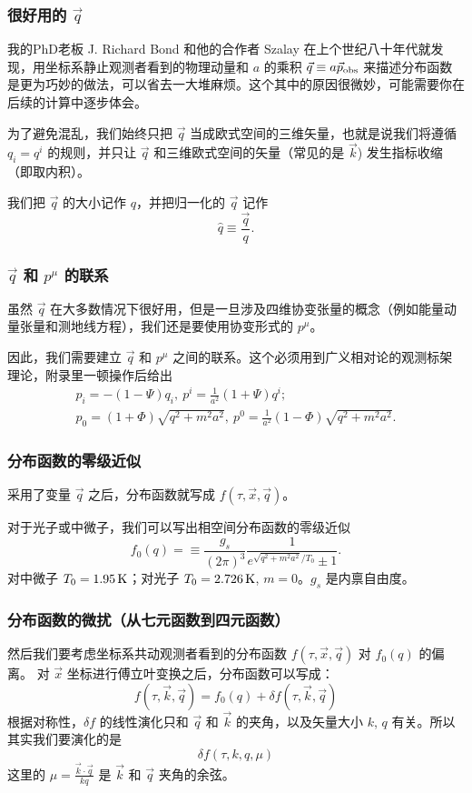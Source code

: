 \documentclass[CJK,13pt]{beamer}
\begin{document}
  \begin{frame}
    \frametitle{很好用的 $\vec{q}$ }
    我的PhD老板 J. Richard Bond 和他的合作者 Szalay 在上个世纪八十年代就发现，用坐标系静止观测者看到的物理动量和 $a$ 的乘积 $\vec{q}\equiv a \vec{p}_{\rm obs}$ 来描述分布函数是更为巧妙的做法，可以省去一大堆麻烦。这个其中的原因很微妙，可能需要你在后续的计算中逐步体会。

    \skipline

    为了避免混乱，我们始终只把 $\vec{q}$ 当成欧式空间的三维矢量，也就是说我们将遵循 {\blue $q_i = q^i$} 的规则，并只让 $\vec{q}$ 和三维欧式空间的矢量（常见的是 $\vec{k}$) 发生指标收缩（即取内积）。

    \skipline      

    我们把 $\vec{q}$ 的大小记作 $q$，并把归一化的 $\vec{q}$ 记作
    $$\hat{q} \equiv \frac{\vec{q}}{q}.$$
  \end{frame}

  \begin{frame}
    \frametitle{$\vec{q}$ 和 $p^\mu$ 的联系}
    虽然 $\vec{q}$ 在大多数情况下很好用，但是一旦涉及四维协变张量的概念（例如能量动量张量和测地线方程），我们还是要使用协变形式的 $p^\mu$。

    因此，我们需要建立 $\vec{q}$ 和 $p^\mu$ 之间的联系。这个必须用到广义相对论的观测标架理论，附录里一顿操作后给出{\blue
    \begin{eqnarray}
     p_i = -(1-\Psi) q_i,\ p^i = \frac{1}{a^2}(1+\Psi)q^i; \nonumber \\
     p_0 = (1+\Phi) \sqrt{q^2+m^2a^2},\ p^0 = \frac{1}{a^2}(1-\Phi)\sqrt{q^2+m^2a^2}. \label{eq:pq}
    \end{eqnarray}}
    
  \end{frame}


  
  \begin{frame}
    \frametitle{分布函数的零级近似}
    采用了变量 $\vec{q}$ 之后，分布函数就写成 $f(\tau, \vec{x}, \vec{q})$。

    \skiplines
    
    对于光子或中微子，我们可以写出相空间分布函数的零级近似
    $$ f_0 (q) = \equiv \frac{g_s}{(2\pi)^3}\frac{1}{e^{\sqrt{q^2+m^2a^2}/T_0} \pm 1} . $$
    对中微子 $T_0 = 1.95\,\mathrm{K}$；对光子  $T_0 = 2.726\,\mathrm{K}$, $m=0$。$g_s$ 是内禀自由度。
  \end{frame}


  \begin{frame}
    \frametitle{分布函数的微扰（从七元函数到四元函数）}
    然后我们要考虑坐标系共动观测者看到的分布函数 $f(\tau, \vec{x}, \vec{q})$ 对 $f_0(q)$ 的偏离。 对 $\vec{x}$ 坐标进行傅立叶变换之后，分布函数可以写成：
    $$ f(\tau,\vec{k}, \vec{q}) = f_0(q) + \delta f (\tau, \vec{k},\vec{q}) $$
    根据对称性，$\delta f$ 的线性演化只和 $\vec{q}$ 和 $\vec{k}$ 的夹角，以及矢量大小 $k$, $q$ 有关。所以其实我们要演化的是
    $$ \delta f(\tau, k, q, \mu) $$
    这里的 {\blue $\mu = \frac{\vec{k}\cdot\vec{q}}{kq}$ 是 $\vec{k}$ 和 $\vec{q}$ 夹角的余弦。}
    
  \end{frame}
\end{document}
